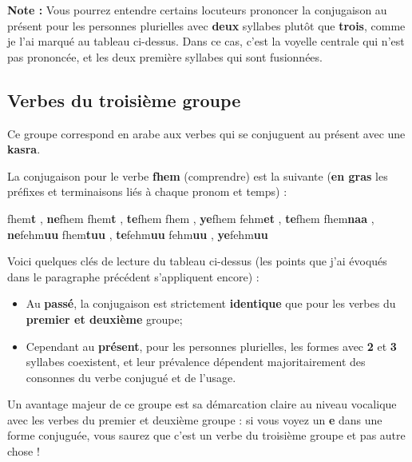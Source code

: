 \textbf{Note :} Vous pourrez entendre certains locuteurs prononcer la conjugaison au présent pour les personnes plurielles avec \textbf{deux} syllabes plutôt que \textbf{trois}, comme je l'ai marqué au tableau ci-dessus. Dans ce cas, c'est la voyelle centrale qui n'est pas prononcée, et les deux première syllabes qui sont fusionnées.

\subsection{Verbes du troisième groupe}\label{ConjSS43}
Ce groupe correspond en arabe aux verbes qui se conjuguent au présent avec une \textbf{kasra}.

La conjugaison pour le verbe \textbf{fhem} (comprendre) est la suivante (\textbf{en gras} les préfixes et terminaisons liés à chaque pronom et temps) :
 
    {fhem\textbf{t} , \textbf{ne}fhem} 
    {fhem\textbf{t} , \textbf{te}fhem} 
    {fhem , \textbf{ye}fhem} 
    {fehm\textbf{et} , \textbf{te}fhem} 
    {fhem\textbf{naa} , \textbf{ne}fehm\textbf{uu}} 
    {fhem\textbf{tuu} , \textbf{te}fehm\textbf{uu}} 
    {fehm\textbf{uu} , \textbf{ye}fehm\textbf{uu}} 

Voici quelques clés de lecture du tableau ci-dessus (les points que j'ai évoqués dans le paragraphe précédent s'appliquent encore) :

\begin{itemize}
    \item Au \textbf{passé}, la conjugaison est strictement \textbf{identique} que pour les verbes du \textbf{premier et deuxième} groupe;
    \item Cependant au \textbf{présent}, pour les personnes plurielles, les formes avec \textbf{2} et \textbf{3} syllabes coexistent, et leur prévalence dépendent majoritairement des consonnes du verbe conjugué et de l'usage. 
\end{itemize}

Un avantage majeur de ce groupe est sa démarcation claire au niveau vocalique avec les verbes du premier et deuxième groupe : si vous voyez un \textbf{e} dans une forme conjuguée, vous saurez que c'est un verbe du troisième groupe et pas autre chose ! 


